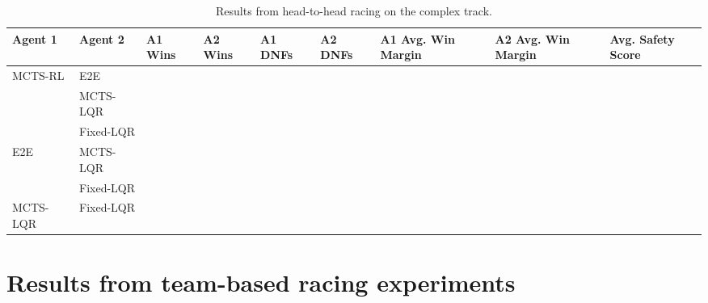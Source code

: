 \begin{table} [H]
\centering
\begin{tabular}{@{}lllllllll@{}} 
\toprule
Agent 1  & Agent 2  & A1 Wins & A2 Wins & A1 DNFs & A2 DNFs & A1 Avg. Win Margin & A2 Avg. Win Margin & Avg. Safety Score \\ \midrule
MCTS-RL  & E2E       &         &         &         &         &                  &   &               \\
         & MCTS-LQR  &         &         &         &         &                  &   &               \\
         & Fixed-LQR &         &         &         &         &                  &   &               \\
E2E      & MCTS-LQR  &         &         &         &         &                  &    &              \\
         & Fixed-LQR &         &         &         &         &                  &    &              \\
MCTS-LQR & Fixed-LQR &         &         &         &         &                  &   &               \\ \bottomrule

\end{tabular}
\vspace{1 mm}
\caption{Results from head-to-head racing on the complex track.}
 \label{tab:results_complex}
\end{table}

\chapter{Results from team-based racing experiments} \label{app:team_results}